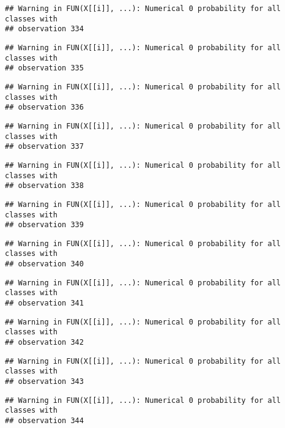\documentclass[
]{article}
\begin{document}
\begin{verbatim}
## Warning in FUN(X[[i]], ...): Numerical 0 probability for all classes with
## observation 334
\end{verbatim}

\begin{verbatim}
## Warning in FUN(X[[i]], ...): Numerical 0 probability for all classes with
## observation 335
\end{verbatim}

\begin{verbatim}
## Warning in FUN(X[[i]], ...): Numerical 0 probability for all classes with
## observation 336
\end{verbatim}

\begin{verbatim}
## Warning in FUN(X[[i]], ...): Numerical 0 probability for all classes with
## observation 337
\end{verbatim}

\begin{verbatim}
## Warning in FUN(X[[i]], ...): Numerical 0 probability for all classes with
## observation 338
\end{verbatim}

\begin{verbatim}
## Warning in FUN(X[[i]], ...): Numerical 0 probability for all classes with
## observation 339
\end{verbatim}

\begin{verbatim}
## Warning in FUN(X[[i]], ...): Numerical 0 probability for all classes with
## observation 340
\end{verbatim}

\begin{verbatim}
## Warning in FUN(X[[i]], ...): Numerical 0 probability for all classes with
## observation 341
\end{verbatim}

\begin{verbatim}
## Warning in FUN(X[[i]], ...): Numerical 0 probability for all classes with
## observation 342
\end{verbatim}

\begin{verbatim}
## Warning in FUN(X[[i]], ...): Numerical 0 probability for all classes with
## observation 343
\end{verbatim}

\begin{verbatim}
## Warning in FUN(X[[i]], ...): Numerical 0 probability for all classes with
## observation 344
\end{verbatim}
\end{document}

